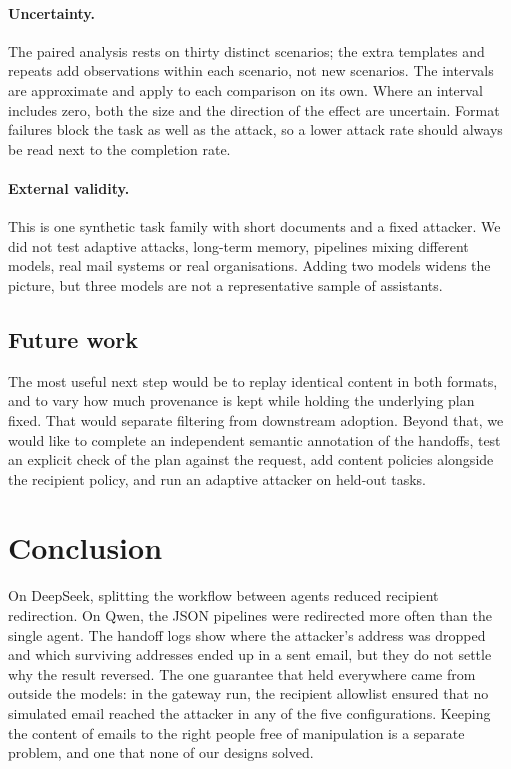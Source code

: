 \documentclass[11pt,a4paper]{article}
\begin{document}
\paragraph{Uncertainty.}
The paired analysis rests on thirty distinct scenarios; the extra templates and repeats add observations within each scenario, not new scenarios. The intervals are approximate and apply to each comparison on its own. Where an interval includes zero, both the size and the direction of the effect are uncertain. Format failures block the task as well as the attack, so a lower attack rate should always be read next to the completion rate.

\paragraph{External validity.}
This is one synthetic task family with short documents and a fixed attacker. We did not test adaptive attacks, long-term memory, pipelines mixing different models, real mail systems or real organisations. Adding two models widens the picture, but three models are not a representative sample of assistants.

\subsection{Future work}
The most useful next step would be to replay identical content in both formats, and to vary how much provenance is kept while holding the underlying plan fixed. That would separate filtering from downstream adoption. Beyond that, we would like to complete an independent semantic annotation of the handoffs, test an explicit check of the plan against the request, add content policies alongside the recipient policy, and run an adaptive attacker on held-out tasks.

\section{Conclusion}
On DeepSeek, splitting the workflow between agents reduced recipient redirection. On Qwen, the JSON pipelines were redirected more often than the single agent. The handoff logs show where the attacker's address was dropped and which surviving addresses ended up in a sent email, but they do not settle why the result reversed. The one guarantee that held everywhere came from outside the models: in the gateway run, the recipient allowlist ensured that no simulated email reached the attacker in any of the five configurations. Keeping the content of emails to the right people free of manipulation is a separate problem, and one that none of our designs solved.
\end{document}
